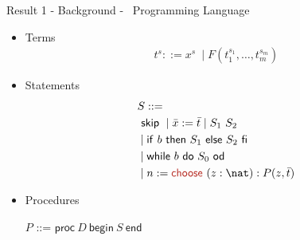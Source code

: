 \begin{frame}{Result 1 - Background - \WhileCC\ Programming Language}
    \pause
    \footnotesize
    \begin{minipage}[t]{0.33\linewidth}
        \vspace{-1.8em}
       \center
        \textbf{\color{Blue}{Syntax}
        }
         \begin{itemize}
                \pause \item Terms
                \vspace{-0.5em}
                        \begin{align*}
                         t^s ::= x^s\ \mid F(t_1^{s_1}, \ldots , t_m^{s_m})
                        \end{align*}
                \vspace{-2.7em}
                \pause \item Statements
                \vspace{-0.5em}
                    \begin{align*}
                        &S ::=\\
                                &\ \mathsf{skip}\
                                \mid \bar{x} := \bar{t}
                                \mid S_1\ S_2\\
                                &\mid \mathsf{if}\ b \ \mathsf{then}\ S_1 \ \mathsf{else}\ S_2\ \mathsf{fi}\ \\
                                &\mid \mathsf{while}\ b\ \mathsf{do}\ S_0\ \mathsf{od}
                                \\
                                &\mid n:= \textcolor{BrickRed}{\mathsf{choose\ }} (z: \nat): P(z,\bar{t})
                    \end{align*}
                \vspace{-1.7em}
                \pause \item Procedures
                    \begin{center}
                        $P$ ::= $\mathsf{proc} \ D\ \mathsf{begin}\ S\ \mathsf{end}$
                    \end{center}
                        

\end{itemize}
\end{minipage}
\end{frame}
